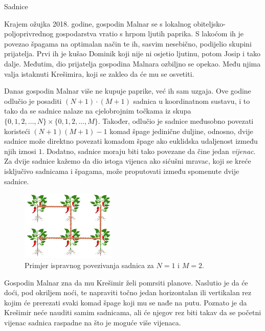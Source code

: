 \begin{statement}[
  problempoints=100,
  timelimit=3 sekunde,
  memorylimit=512 MiB,
]{Sadnice}

Krajem ožujka 2018. godine, gospodin Malnar se s lokalnog
obiteljsko-poljoprivrednog gospodarstva vratio s hrpom ljutih paprika.
S lakoćom ih je povezao špagama na optimalan način te ih, sasvim nesebično,
podijelio skupini prijatelja. Prvi ih je kušao Dominik koji nije ni osjetio
ljutinu, potom Josip i tako dalje. Međutim, dio prijatelja gospodina Malnara
ozbiljno se opekao. Među njima valja istaknuti Krešimira, koji se zakleo da
će mu se osvetiti.

Danas gospodin Malnar više ne kupuje paprike, već ih sam uzgaja. Ove godine
odlučio je posaditi $(N+1) \cdot (M+1)$ sadnica u koordinatnom sustavu, i to
tako da se sadnice nalaze na cjelobrojnim točkama iz skupa $\{0,1,2,\dots,N\}
\times \{0,1,2,\dots,M\}$. Također, odlučio je sadnice međusobno povezati
koristeći $(N+1)(M+1)-1$ komad špage jedinične duljine, odnosno, dvije
sadnice može direktno povezati komadom špage ako euklidska udaljenost između
njih iznosi $1$. Dodatno, sadnice moraju biti tako povezane da čine jedan
\textit{vijenac}. Za dvije sadnice kažemo da dio istoga vijenca ako sićušni
mravac, koji se kreće isključivo sadnicama i špagama, može proputovati između
spomenute dvije sadnice.

\begin{figure}[H]
  \begin{center}
    \includegraphics[width=0.4\textwidth]{img/skica.png}
    \caption*{Primjer ispravnog povezivanja sadnica za $N=1$ i $M=2$.}
  \end{center}
\end{figure}
  \vspace{-0.7cm}

Gospodin Malnar zna da mu Krešimir želi pomrsiti planove. Naslutio je da će
doći, pod okriljem noći, te napraviti točno jedan horizontalan ili
vertikalan rez kojim će prerezati svaki komad špage koji mu se nađe na putu.
Poznato je da Krešimir neće nauditi samim sadnicama, ali će njegov rez biti
takav da se početni vijenac sadnica raspadne na što je moguće više vijenaca.


\end{statement}
